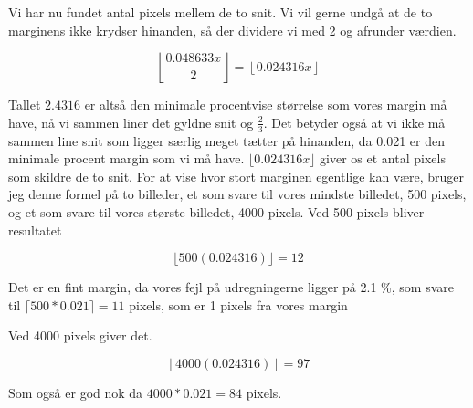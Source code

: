 Vi har nu fundet antal pixels mellem de to snit. Vi vil gerne undgå at
de to marginens ikke krydser hinanden, så der dividere vi med 2 og
afrunder værdien.

\begin{equation}
	\left\lfloor \frac{0.048633x}{2}\right\rfloor = \left\lfloor0.024316x \right\rfloor
\end{equation}

Tallet $2.4316$ er altså den minimale procentvise størrelse som vores
margin må have, nå vi sammen liner det gyldne snit og $\frac{2}{3}$.
Det betyder også at vi ikke må sammen line snit som ligger særlig
meget tætter på hinanden, da 0.021 er den minimale procent margin som vi må have.
$\lfloor 0.024316x \rfloor$ giver os et antal pixels som skildre de to snit. For at vise
hvor stort marginen egentlige kan være, bruger jeg denne formel på to
billeder, et som svare til vores mindste billedet, 500 pixels, og et
som svare til vores største billedet, 4000 pixels. Ved 500 pixels
bliver resultatet

\begin{equation}
	 \lfloor 500(0.024316)\rfloor = 12
\end{equation}

Det er en fint margin, da vores fejl på udregningerne ligger på 2.1 \%,
som svare til $\lceil 500*0.021 \rceil = 11$ pixels, som er 1 pixels fra vores
margin

Ved 4000 pixels giver det.

\begin{equation}
	 \left\lfloor 4000(0.024316)\right\rfloor = 97
\end{equation}

Som også er god nok da $4000*0.021 = 84$ pixels.
